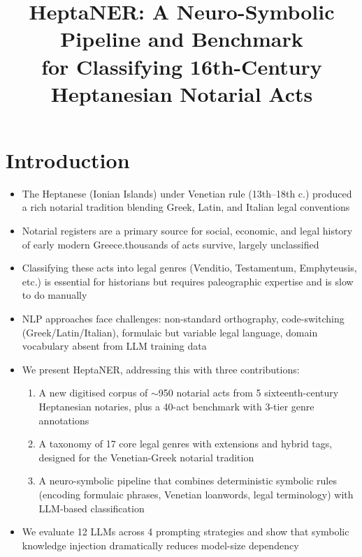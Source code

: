 \documentclass[10pt, a4paper]{article}
\title{HeptaNER: A Neuro-Symbolic Pipeline and Benchmark\\for Classifying 16th-Century Heptanesian Notarial Acts}
\begin{document}
\maketitle


\section{Introduction}

\begin{itemize}
\item The Heptanese (Ionian Islands) under Venetian rule (13th--18th c.) produced a rich notarial tradition blending Greek, Latin, and Italian legal conventions
\item Notarial registers are a primary source for social, economic, and legal history of early modern Greece.thousands of acts survive, largely unclassified
\item Classifying these acts into legal genres (Venditio, Testamentum, Emphyteusis, etc.) is essential for historians but requires paleographic expertise and is slow to do manually
\item NLP approaches face challenges: non-standard orthography, code-switching (Greek/Latin/Italian), formulaic but variable legal language, domain vocabulary absent from LLM training data
\item We present HeptaNER, addressing this with three contributions:
  \begin{enumerate}
  \item A new digitised corpus of $\sim$950 notarial acts from 5 sixteenth-century Heptanesian notaries, plus a 40-act benchmark with 3-tier genre annotations
  \item A taxonomy of 17 core legal genres with extensions and hybrid tags, designed for the Venetian-Greek notarial tradition
  \item A neuro-symbolic pipeline that combines deterministic symbolic rules (encoding formulaic phrases, Venetian loanwords, legal terminology) with LLM-based classification
  \end{enumerate}
\item We evaluate 12 LLMs across 4 prompting strategies and show that symbolic knowledge injection dramatically reduces model-size dependency
\end{itemize}


\end{document}
